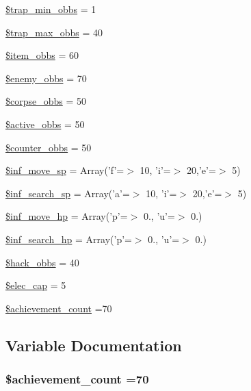\begin{DoxyCompactItemize}
\item 
\hyperlink{gamecfg__1_8php_a0ed154a4bb0be6af71ede7fbfaa98d6d}{\$trap\+\_\+min\+\_\+obbs} = 1
\item 
\hyperlink{gamecfg__1_8php_a9d92ed0c2b746222f83ba28a09a0d731}{\$trap\+\_\+max\+\_\+obbs} = 40
\item 
\hyperlink{gamecfg__1_8php_a8e0c351836ca891237ccdf99d4ba43db}{\$item\+\_\+obbs} = 60
\item 
\hyperlink{gamecfg__1_8php_a96c4f1ea70365ee6aebfe4bc493599f1}{\$enemy\+\_\+obbs} = 70
\item 
\hyperlink{gamecfg__1_8php_a2a3e2f1ad9ceb6f3dd91eeed944164c1}{\$corpse\+\_\+obbs} = 50
\item 
\hyperlink{gamecfg__1_8php_a8f4d34dce8ae1c6ac3012aab072d135d}{\$active\+\_\+obbs} = 50
\item 
\hyperlink{gamecfg__1_8php_a81eebe5aca6408cce5219624c52f7f86}{\$counter\+\_\+obbs} = 50
\item 
\hyperlink{gamecfg__1_8php_a8f9e2b10302dd8139d0a48e12b50aa34}{\$inf\+\_\+move\+\_\+sp} = Array('f'=$>$ 10, 'i'=$>$ 20,'e'=$>$ 5)
\item 
\hyperlink{gamecfg__1_8php_aac9419f8273e4ce38d3fdab56c41e730}{\$inf\+\_\+search\+\_\+sp} = Array('a'=$>$ 10, 'i'=$>$ 20,'e'=$>$ 5)
\item 
\hyperlink{gamecfg__1_8php_a129a85084499d20f3a06bb65ffd96afa}{\$inf\+\_\+move\+\_\+hp} = Array('p'=$>$ 0., 'u'=$>$ 0.)
\item 
\hyperlink{gamecfg__1_8php_aa7bf96c31829f50f880615bfb21880e6}{\$inf\+\_\+search\+\_\+hp} = Array('p'=$>$ 0., 'u'=$>$ 0.)
\item 
\hyperlink{gamecfg__1_8php_ace20ccf761c1d090f4a6db31168b0883}{\$hack\+\_\+obbs} = 40
\item 
\hyperlink{gamecfg__1_8php_a39619187fb922174267c2afe66e28572}{\$elec\+\_\+cap} = 5
\item 
\hyperlink{gamecfg__1_8php_afe46f7e0d803d62e1ed0ba41d68dd597}{\$achievement\+\_\+count} =70
\end{DoxyCompactItemize}


\subsection{Variable Documentation}
\hypertarget{gamecfg__1_8php_afe46f7e0d803d62e1ed0ba41d68dd597}{
\subsubsection[{\$achievement\+\_\+count}]{\setlength{\rightskip}{0pt plus 5cm}\$achievement\+\_\+count =70}}\label{gamecfg__1_8php_afe46f7e0d803d62e1ed0ba41d68dd597}



